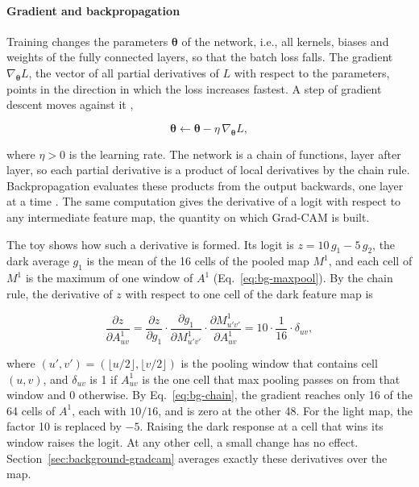 \paragraph{Gradient and backpropagation}
Training changes the parameters $\bm{\theta}$ of the network, i.e., all kernels, biases and
weights of the fully connected layers, so that the batch loss falls. The gradient
$\nabla_{\bm{\theta}} L$, the vector of all partial derivatives of $L$ with respect to the
parameters, points in the direction in which the loss increases fastest. A step of
gradient descent moves against it \citep[Sec.~4.3]{goodfellow2016deep},

\begin{equation}
\bm{\theta} \leftarrow \bm{\theta} - \eta\, \nabla_{\bm{\theta}} L,
\label{eq:bg-gd}
\end{equation}

where $\eta > 0$ is the learning rate. The network is a chain of functions, layer after
layer, so each partial derivative is a product of local derivatives by the chain rule.
Backpropagation evaluates these products from the output backwards, one layer at a
time \citep[Sec.~6.5]{goodfellow2016deep}. The same computation gives the derivative of a logit
with respect to any intermediate feature map, the quantity on which Grad-CAM is built.

The toy shows how such a derivative is formed. Its logit is $z = 10\,g_1 - 5\,g_2$, the
dark average $g_1$ is the mean of the 16 cells of the pooled map $M^1$, and each cell of
$M^1$ is the maximum of one window of $A^1$ (Eq.~\eqref{eq:bg-maxpool}). By the chain
rule, the derivative of $z$ with respect to one cell of the dark feature map is

\begin{equation}
\frac{\partial z}{\partial A^1_{uv}}
= \frac{\partial z}{\partial g_1} \cdot
  \frac{\partial g_1}{\partial M^1_{u'v'}} \cdot
  \frac{\partial M^1_{u'v'}}{\partial A^1_{uv}}
= 10 \cdot \frac{1}{16} \cdot \delta_{uv},
\label{eq:bg-chain}
\end{equation}

where $(u', v') = (\lfloor u/2 \rfloor, \lfloor v/2 \rfloor)$ is the pooling window that
contains cell $(u, v)$, and $\delta_{uv}$ is 1 if $A^1_{uv}$ is the one cell that max
pooling passes on from that window and 0 otherwise. By Eq.~\eqref{eq:bg-chain}, the
gradient reaches only 16 of the 64 cells of $A^1$, each with $10/16$, and is zero at the
other 48. For the light map, the factor 10 is replaced by $-5$. Raising the dark
response at a cell that wins its window raises the logit. At any other cell, a small
change has no effect. Section~\ref{sec:background-gradcam} averages exactly these
derivatives over the map.

